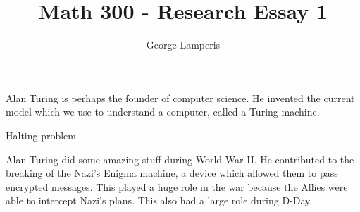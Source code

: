 \documentclass[12pt]{article}
\title{Math 300 - Research Essay 1}
\author{George Lamperis}
\date{}
\theoremstyle{mystyle}
\begin{document}
\maketitle

Alan Turing is perhaps the founder of computer science. He invented the current
model which we use to understand a computer, called a Turing machine. 

Halting problem

Alan Turing did some amazing stuff during World War II. He contributed to the
breaking of the Nazi's Enigma machine, a device which allowed them to pass
encrypted messages. This played a huge role in the war because the Allies were
able to intercept Nazi's plans. This also had a large role during D-Day.
\end{document}
